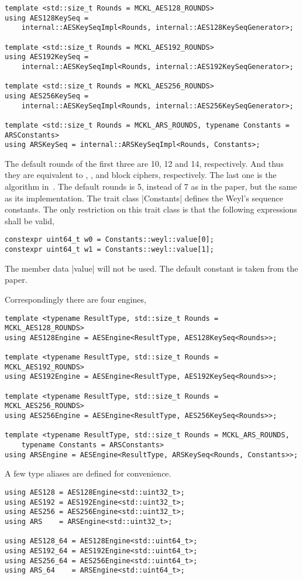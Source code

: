 \begin{verbatim}
template <std::size_t Rounds = MCKL_AES128_ROUNDS>
using AES128KeySeq =
    internal::AESKeySeqImpl<Rounds, internal::AES128KeySeqGenerator>;

template <std::size_t Rounds = MCKL_AES192_ROUNDS>
using AES192KeySeq =
    internal::AESKeySeqImpl<Rounds, internal::AES192KeySeqGenerator>;

template <std::size_t Rounds = MCKL_AES256_ROUNDS>
using AES256KeySeq =
    internal::AESKeySeqImpl<Rounds, internal::AES256KeySeqGenerator>;

template <std::size_t Rounds = MCKL_ARS_ROUNDS, typename Constants = ARSConstants>
using ARSKeySeq = internal::ARSKeySeqImpl<Rounds, Constants>;
\end{verbatim}
The default rounds of the first three are 10, 12 and 14, respectively. And thus
they are equivalent to , , and  block ciphers,
respectively. The last one is the \ars algorithm in~\cite{Salmon:2011um}. The
default rounds is 5, instead of 7 as in the paper, but the same as its \mkl
implementation. The trait class |Constants| defines the Weyl's sequence
constants. The only restriction on this trait class is that the following
expressions shall be valid,
\begin{verbatim}
constexpr uint64_t w0 = Constants::weyl::value[0];
constexpr uint64_t w1 = Constants::weyl::value[1];
\end{verbatim}
The member data |value| will not be \odr used. The default constant is taken
from the paper.

Correspondingly there are four \rng engines,
\begin{verbatim}
template <typename ResultType, std::size_t Rounds = MCKL_AES128_ROUNDS>
using AES128Engine = AESEngine<ResultType, AES128KeySeq<Rounds>>;

template <typename ResultType, std::size_t Rounds = MCKL_AES192_ROUNDS>
using AES192Engine = AESEngine<ResultType, AES192KeySeq<Rounds>>;

template <typename ResultType, std::size_t Rounds = MCKL_AES256_ROUNDS>
using AES256Engine = AESEngine<ResultType, AES256KeySeq<Rounds>>;

template <typename ResultType, std::size_t Rounds = MCKL_ARS_ROUNDS,
    typename Constants = ARSConstants>
using ARSEngine = AESEngine<ResultType, ARSKeySeq<Rounds, Constants>>;
\end{verbatim}
A few type aliases are defined for convenience.
\begin{verbatim}
using AES128 = AES128Engine<std::uint32_t>;
using AES192 = AES192Engine<std::uint32_t>;
using AES256 = AES256Engine<std::uint32_t>;
using ARS    = ARSEngine<std::uint32_t>;

using AES128_64 = AES128Engine<std::uint64_t>;
using AES192_64 = AES192Engine<std::uint64_t>;
using AES256_64 = AES256Engine<std::uint64_t>;
using ARS_64    = ARSEngine<std::uint64_t>;
\end{verbatim}

